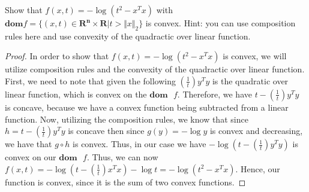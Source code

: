 \begin{prob}[2.2]
  Show that $f(x,t) = -\log (t^{2} - x^{T}x)$ with $\mathbf{dom} f = \{(x,t) \in \mathbf{R^{n}} \times \mathbf{R} \vert t > \Vert x \Vert_{2}\}$ is convex. Hint: you can use composition rules here and use convexity of the quadractic over linear function.
\end{prob}
\begin{proof}
  In order to show that $f(x,t) = -\log (t^{2} - x^{T}x)$ is convex, we will utilize composition rules and the convexity of the quadractic over linear function.  First, we need to note that given the following $(\frac{1}{t})y^{T}y$ is the quadratic over linear function, which is convex on the $\mathbf{dom} \mbox{ } f$.  Therefore, we have $t - (\frac{1}{t})y^{T}y$ is concave, because we have a convex function being subtracted from a linear function.  Now, utilizing the composition rules, we know that since $h = t - (\frac{1}{t})y^{T}y$ is concave then since $g(y) = -\log{y}$ is convex and decreasing, we have that $g \circ h$ is convex. Thus, in our case we have $-\log(t - (\frac{1}{t})y^{T}y)$ is convex on our $\mathbf{dom} \mbox{ } f$.  Thus, we can now $f(x, t) = -\log(t - (\frac{1}{t})x^{T}x) - \log t = -\log(t^{2} - x^{T}x)$. Hence, our function is convex, since it is the sum of two convex functions.
\end{proof}
